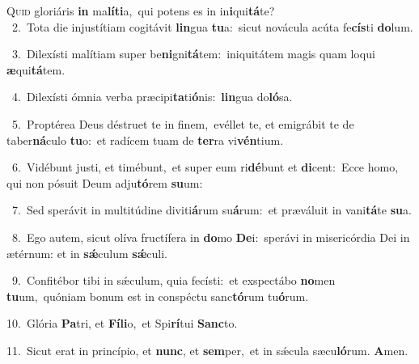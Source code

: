\lettrine{\initial\textcolor{\initialcolor}{Q}}{uid} gloriáris \textbf{in} ma\-\textbf{lí}\-\textbf{ti}a,~\star qui potens es in in\-\textbf{i}\-qui\-\textbf{tá}\-te?\\
{\numbfont\textcolor{\numbcolor}{~2.}}~Tota die injustítiam cogitávit \textbf{lin}\-gua \textbf{tu}\-a:~\star sicut novácula acúta fe\-\textbf{cís}\-ti \textbf{do}\-lum.\par
{\numbfont\textcolor{\numbcolor}{~3.}}~Dilexísti malítiam super be\-\textbf{ni}\-gni\-\textbf{tá}\-tem:~\star iniquitátem magis quam loqui \textbf{æ}\-qui\-\textbf{tá}\-tem.\par
{\numbfont\textcolor{\numbcolor}{~4.}}~Dilexísti ómnia verba præcipi\-\textbf{ta}\-ti\-\textbf{ó}\-nis:~\star \textbf{lin}\-gua do\-\textbf{ló}\-sa.\par
{\numbfont\textcolor{\numbcolor}{~5.}}~Proptérea Deus déstruet te in finem,~\dagger evéllet te, et emigrábit te de taber\-\textbf{ná}\-culo \textbf{tu}\-o:~\star et radícem tuam de \textbf{ter}\-ra vi\-\textbf{vén}\-tium.\par
{\numbfont\textcolor{\numbcolor}{~6.}}~Vidébunt justi, et timébunt,~\dagger et super eum ri\-\textbf{dé}\-bunt et \textbf{di}\-cent:~\star Ecce homo, qui non pósuit Deum adju\-\textbf{tó}\-rem \textbf{su}\-um:\par
{\numbfont\textcolor{\numbcolor}{~7.}}~Sed sperávit in multitúdine diviti\-\textbf{á}\-rum su\-\textbf{á}\-rum:~\star et præváluit in vani\-\textbf{tá}\-te \textbf{su}\-a.\par
{\numbfont\textcolor{\numbcolor}{~8.}}~Ego autem, sicut olíva fructífera in \textbf{do}\-mo \textbf{De}\-i:~\star sperávi in misericórdia Dei in ætérnum: et in \textbf{sǽ}\-culum \textbf{sǽ}\-culi.\par
{\numbfont\textcolor{\numbcolor}{~9.}}~Confitébor tibi in sǽculum, quia fecísti:~\dagger et exspectábo \textbf{no}\-men \textbf{tu}\-um,~\star quóniam bonum est in conspéctu sanc\-\textbf{tó}\-rum tu\-\textbf{ó}\-rum.\par
{\numbfont\textcolor{\numbcolor}{10.}}~Glória \textbf{Pa}\-tri, et \textbf{Fí}\-\textbf{li}o,~\star et Spi\-\textbf{rí}\-tui \textbf{Sanc}\-to.\par
{\numbfont\textcolor{\numbcolor}{11.}}~Sicut erat in princípio, et \textbf{nunc}\-, et \textbf{sem}\-per,~\star et in sǽcula sæcu\-\textbf{ló}\-rum. \textbf{A}\-men.\par

